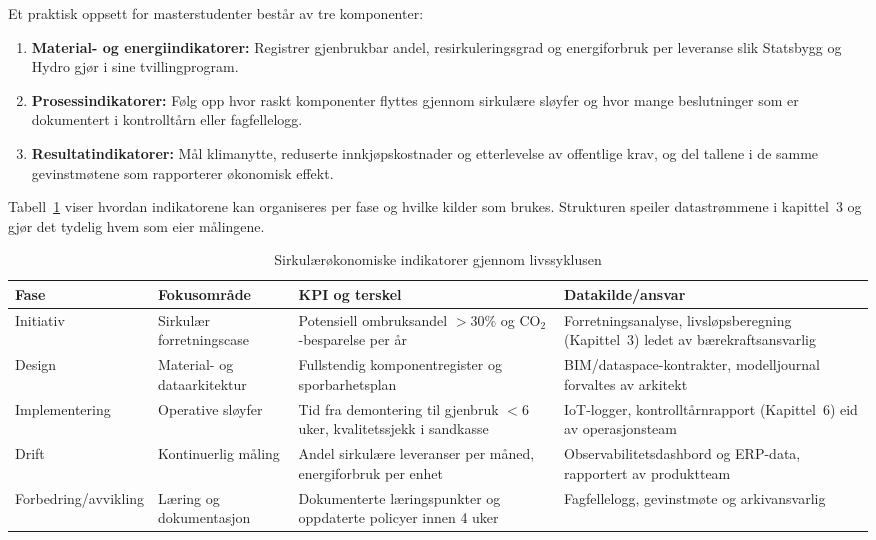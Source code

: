Et praktisk oppsett for masterstudenter består av tre komponenter:
\begin{enumerate}
    \item \textbf{Material- og energiindikatorer:} Registrer gjenbrukbar andel, resirkuleringsgrad og energiforbruk per leveranse slik Statsbygg og Hydro gjør i sine tvillingprogram.\citep{statsbygg2022ombruk,hydro2023traceability}
    \item \textbf{Prosessindikatorer:} Følg opp hvor raskt komponenter flyttes gjennom sirkulære sløyfer og hvor mange beslutninger som er dokumentert i kontrolltårn eller fagfellelogg.
    \item \textbf{Resultatindikatorer:} Mål klimanytte, reduserte innkjøpskostnader og etterlevelse av offentlige krav, og del tallene i de samme gevinstmøtene som rapporterer økonomisk effekt.
\end{enumerate}

Tabell~\ref{tab:sirkular-livssyklus} viser hvordan indikatorene kan organiseres per fase og hvilke kilder som brukes. Strukturen speiler datastrømmene i kapittel~3 og gjør det tydelig hvem som eier målingene.

\begin{table}[h]
    \centering
    \caption{Sirkulærøkonomiske indikatorer gjennom livssyklusen}
    \label{tab:sirkular-livssyklus}
    \begin{tabular}{p{2.7cm}p{3.7cm}p{3.5cm}p{3.0cm}}
        \toprule
        Fase & Fokusområde & KPI og terskel & Datakilde/ansvar \\
        \midrule
        Initiativ & Sirkulær forretningscase & Potensiell ombruksandel $>30\%$ og CO$_2$-besparelse per år & Forretningsanalyse, livsløpsberegning (Kapittel~3) ledet av bærekraftsansvarlig \\
        Design & Material- og dataarkitektur & Fullstendig komponentregister og sporbarhetsplan & BIM/dataspace-kontrakter, modelljournal forvaltes av arkitekt \\
        Implementering & Operative sløyfer & Tid fra demontering til gjenbruk $<6$ uker, kvalitetssjekk i sandkasse & IoT-logger, kontrolltårnrapport (Kapittel~6) eid av operasjonsteam \\
        Drift & Kontinuerlig måling & Andel sirkulære leveranser per måned, energiforbruk per enhet & Observabilitetsdashbord og ERP-data, rapportert av produktteam \\
        Forbedring/avvikling & Læring og dokumentasjon & Dokumenterte læringspunkter og oppdaterte policyer innen 4 uker & Fagfellelogg, gevinstmøte og arkivansvarlig \\
        \bottomrule
    \end{tabular}
\end{table}

